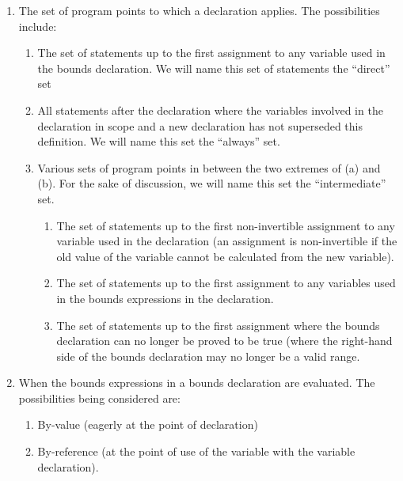 \documentclass[]{article}
\begin{document}
\begin{enumerate}
\def\labelenumi{\arabic{enumi}.}
\item
  The set of program points to which a declaration applies. The
  possibilities include:

  \begin{enumerate}
  \def\labelenumii{\alph{enumii}.}
  \item
    The set of statements up to the first assignment to any variable
    used in the bounds declaration. We will name this set of statements
    the ``direct'' set
  \item
    All statements after the declaration where the variables involved in
    the declaration in scope and a new declaration has not superseded
    this definition. We will name this set the ``always'' set.
  \item
    Various sets of program points in between the two extremes of (a)
    and (b). For the sake of discussion, we will name this set the
    ``intermediate'' set.

    \begin{enumerate}
    \def\labelenumiii{\roman{enumiii}.}
    \item
      The set of statements up to the first non-invertible assignment to
      any variable used in the declaration (an assignment is
      non-invertible if the old value of the variable cannot be
      calculated from the new variable).
    \item
      The set of statements up to the first assignment to any variables
      used in the bounds expressions in the declaration.
    \item
      The set of statements up to the first assignment where the bounds
      declaration can no longer be proved to be true (where the
      right-hand side of the bounds declaration may no longer be a valid
      range.
    \end{enumerate}
  \end{enumerate}
\item
  When the bounds expressions in a bounds declaration are evaluated. The
  possibilities being considered are:

  \begin{enumerate}
  \def\labelenumii{\alph{enumii}.}
  \item
    By-value (eagerly at the point of declaration)
  \item
    By-reference (at the point of use of the variable with the variable
    declaration).
  \end{enumerate}
\end{enumerate}
\end{document}
